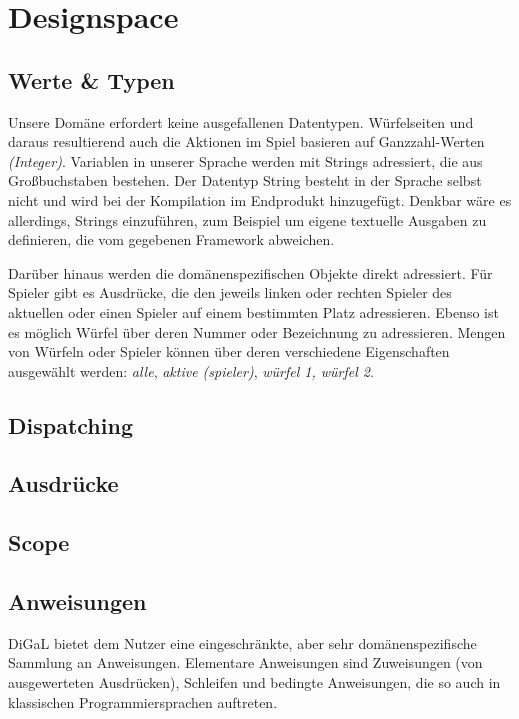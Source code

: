 \section{Designspace} %
\label{sec:designspace}

\subsection{Werte \& Typen} %
\label{sub:werte_typen}
Unsere Domäne erfordert keine ausgefallenen Datentypen. Würfelseiten und daraus resultierend auch die Aktionen im Spiel basieren auf Ganzzahl-Werten \emph{(Integer)}. Variablen in unserer Sprache werden mit Strings adressiert, die aus Großbuchstaben bestehen. Der Datentyp String besteht in der Sprache selbst nicht und wird bei der Kompilation im Endprodukt hinzugefügt. Denkbar wäre es allerdings, Strings einzuführen, zum Beispiel um eigene textuelle Ausgaben zu definieren, die vom gegebenen Framework abweichen.

Darüber hinaus werden die domänenspezifischen Objekte direkt adressiert. Für Spieler gibt es Ausdrücke, die den jeweils linken oder rechten Spieler des aktuellen oder einen Spieler auf einem bestimmten Platz adressieren. Ebenso ist es möglich Würfel über deren Nummer oder Bezeichnung zu adressieren. Mengen von Würfeln oder Spieler können über deren verschiedene Eigenschaften ausgewählt werden: \emph{alle}, \emph{aktive (spieler)}, \emph{würfel 1, würfel 2}.

\subsection{Dispatching} %
\label{sub:dispatching}


\subsection{Ausdrücke} %
\label{sub:ausdrucke}


\subsection{Scope} %
\label{sub:scope}


\subsection{Anweisungen} %
\label{sub:anweisungen}
DiGaL bietet dem Nutzer eine eingeschränkte, aber sehr domänenspezifische Sammlung an Anweisungen. Elementare Anweisungen sind Zuweisungen (von ausgewerteten Ausdrücken), Schleifen und bedingte Anweisungen, die so auch in klassischen Programmiersprachen auftreten.

